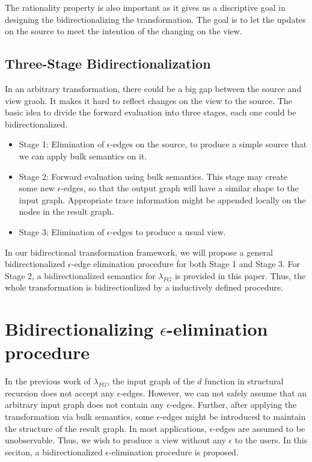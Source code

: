 \documentclass{llncs}
\begin{document}

The rationality property is also important as it gives us a discriptive goal in designing the bidirectionalizing the transformation. The goal is to let the updates on the source to meet the intention of the changing on the view.

\subsection{Three-Stage Bidirectionalization}\label{subsec:3-sta}

In an arbitrary transformation, there could be a big gap between the source and view graoh. It makes it hard to reflect changes on the view to the source. The basic idea to divide the forward evaluation into three stages, each one could be bidirectionalized.
\begin{itemize}
	\item Stage 1: Elimination of $\epsilon$-edges on the source, to produce a simple source that we can apply bulk semantics on it.
	\item Stage 2: Forward evaluation using bulk semantics. This stage may create some new $\epsilon$-edges, so that the output graph will have a similar shape to the input graph. Appropriate trace information might be appended locally on the nodes in the result graph.
	\item Stage 3: Elimination of $\epsilon$-edges to produce a usual view.
\end{itemize}

In our bidirectional transformation framework, we will propose a general bidirectionalized $\epsilon$-edge elimination procedure for both Stage 1 and Stage 3. For Stage 2, a bidirectionalized semantics for $\lambda_{FG}$ is provided in this paper. Thus, the whole transformation is bidirectionlized by a inductively defined procedure.

\section{Bidirectionalizing $\epsilon$-elimination procedure}\label{sec:eps}

In the previous work of $\lambda_{FG}$, the input graph of the $d$ function in structural recursion does not accept any $\epsilon$-edges. However, we can not safely assume that an arbitrary input graph does not contain any $\epsilon$-edges. Further, after applying the transformation via bulk semantics, some $\epsilon$-edges might be introduced to maintain the structure of the result graph. In most applications, $\epsilon$-edges are assumed to be unobservable. Thus, we wish to produce a view without any $\epsilon$ to the users. In this seciton, a bidirectionalized $\epsilon$-elimination procedure is proposed. 
\end{document}
